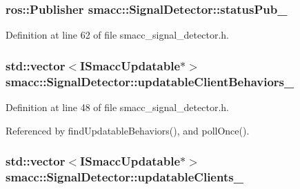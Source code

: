 \subsubsection[{\texorpdfstring{status\+Pub\+\_\+}{statusPub_}}]{\setlength{\rightskip}{0pt plus 5cm}ros\+::\+Publisher smacc\+::\+Signal\+Detector\+::status\+Pub\+\_\+\hspace{0.3cm}{\ttfamily [private]}}\hypertarget{classsmacc_1_1SignalDetector_ae065bbd4e699e5fce00fbc508dedd4c1}{}\label{classsmacc_1_1SignalDetector_ae065bbd4e699e5fce00fbc508dedd4c1}


Definition at line 62 of file smacc\+\_\+signal\+\_\+detector.\+h.

\subsubsection[{\texorpdfstring{updatable\+Client\+Behaviors\+\_\+}{updatableClientBehaviors_}}]{\setlength{\rightskip}{0pt plus 5cm}std\+::vector$<${\bf I\+Smacc\+Updatable}$\ast$$>$ smacc\+::\+Signal\+Detector\+::updatable\+Client\+Behaviors\+\_\+\hspace{0.3cm}{\ttfamily [private]}}\hypertarget{classsmacc_1_1SignalDetector_a777b671ca6bbedd2fdc83f60f9ec8f83}{}\label{classsmacc_1_1SignalDetector_a777b671ca6bbedd2fdc83f60f9ec8f83}


Definition at line 48 of file smacc\+\_\+signal\+\_\+detector.\+h.



Referenced by find\+Updatable\+Behaviors(), and poll\+Once().

\subsubsection[{\texorpdfstring{updatable\+Clients\+\_\+}{updatableClients_}}]{\setlength{\rightskip}{0pt plus 5cm}std\+::vector$<${\bf I\+Smacc\+Updatable}$\ast$$>$ smacc\+::\+Signal\+Detector\+::updatable\+Clients\+\_\+\hspace{0.3cm}{\ttfamily [private]}}\hypertarget{classsmacc_1_1SignalDetector_a36a702afabbc335cbdb1e8699b669323}{}\label{classsmacc_1_1SignalDetector_a36a702afabbc335cbdb1e8699b669323}


